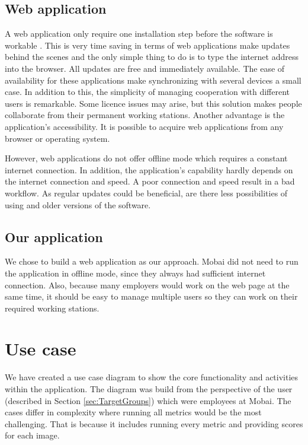 \subsection*{Web application}
A web application only require one installation step before the software is workable \cite{WebVsDesktop}. This is very time saving in terms of web applications make updates behind the scenes and the only simple thing to do is to type the internet address into the browser. All updates are free and immediately available. The ease of availability for these applications make synchronizing with several devices a small case. In addition to this, the simplicity of managing cooperation with different users is remarkable. Some licence issues may arise, but this solution makes people collaborate from their permanent working stations. Another advantage is the application's accessibility. It is possible to acquire web applications from any browser or operating system. 

However, web applications do not offer offline mode which requires a constant internet connection. In addition, the application's capability hardly depends on the internet connection and speed. A poor connection and speed result in a bad workflow. As regular updates could be beneficial, are there less possibilities of using and older versions of the software. 

\subsection*{Our application}
We chose to build a web application as our approach. Mobai did not need to run the application in offline mode, since they always had sufficient internet connection. Also, because many employers would work on the web page at the same time, it should be easy to manage multiple users so they can work on their required working stations. 

\section{Use case}
We have created a use case diagram to show the core functionality and activities within the application. The diagram was build from the perspective of the user (described in Section \ref{sec:TargetGroups}) which were employees at Mobai. The cases differ in complexity where running all metrics would be the most challenging. That is because it includes running every metric and providing scores for each image. 

